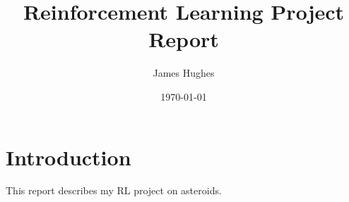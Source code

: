 \documentclass[a4paper,11pt]{article}
\title{Reinforcement Learning Project Report}
\author{James Hughes}
\date{\today}
\begin{document}
\maketitle

\section{Introduction}
This report describes my RL project on asteroids.
\end{document}
